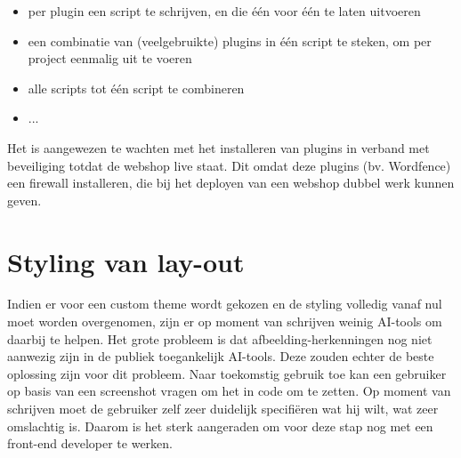 \begin{itemize}
    \item per plugin een script te schrijven, en die één voor één te laten uitvoeren
    \item een combinatie van (veelgebruikte) plugins in één script te steken, om per project eenmalig uit te voeren
    \item alle scripts tot één script te combineren
    \item ...
\end{itemize} 
Het is aangewezen te wachten met het installeren van plugins in verband met beveiliging totdat de webshop live staat. Dit omdat deze plugins (bv. Wordfence) een firewall installeren, die bij het deployen van een webshop dubbel werk kunnen geven.
\section{Styling van lay-out}
Indien er voor een custom theme wordt gekozen en de styling volledig vanaf nul moet worden overgenomen, zijn er op moment van schrijven weinig AI-tools om daarbij te helpen. Het grote probleem is dat afbeelding-herkenningen nog niet aanwezig zijn in de publiek toegankelijk AI-tools. Deze zouden echter de beste oplossing zijn voor dit probleem. Naar toekomstig gebruik toe kan een gebruiker op basis van een screenshot vragen om het in code om te zetten. Op moment van schrijven moet de gebruiker zelf zeer duidelijk specifiëren wat hij wilt, wat zeer omslachtig is. Daarom is het sterk aangeraden om voor deze stap nog met een front-end developer te werken.

